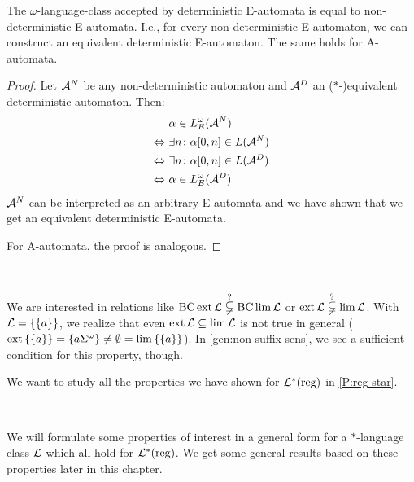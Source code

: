 \begin{lemma}
\label{gen:e-determinism}
The $\omega$-language-class accepted by deterministic E-automata is equal to non-deterministic E-automata. I.e., for every non-deterministic E-automaton, we can construct an equivalent deterministic E-automaton. The same holds for A-automata.
\begin{proof} Let $\mathcal{A}^N$ be any non-deterministic automaton and $\mathcal{A}^D$ an ($*$-)equivalent deterministic automaton. Then:
\begin{align*}
& \alpha \in L^{\omega}_E(\mathcal{A}^N) \\
\Leftrightarrow \ & \exists n \colon \alpha[0,n] \in L(\mathcal{A}^N) \\
\Leftrightarrow \ & \exists n \colon \alpha[0,n] \in L(\mathcal{A}^D) \\
\Leftrightarrow \ & \alpha \in L^{\omega}_E(\mathcal{A}^D)
\end{align*}
$\mathcal{A}^N$ can be interpreted as an arbitrary E-automata and we have shown that we get an equivalent deterministic E-automata.

For A-automata, the proof is analogous.
\end{proof}
\end{lemma}

\

We are interested in relations like $\operatorname{BC} \operatorname{ext} \mathcal{L} \overset{?}{\subsetneqq} \operatorname{BC} \lim \mathcal{L}$ or $\operatorname{ext} \mathcal{L} \overset{?}{\subsetneqq} \lim \mathcal{L}$. With $\Lang = \Set{\Set{a}}$, we realize that even $\operatorname{ext} \mathcal{L} \subseteq \lim \mathcal{L}$ is not true in general ($\ext \Set{\Set{a}} = \Set{a \Sigma^\omega} \neq \emptyset = \lim \Set{\Set{a}}$). In \cref{gen:non-suffix-sens}, we see a sufficient condition for this property, though.

We want to study all the properties we have shown for $\mathcal{L}^*(\textup{\textrm{reg}})$ in \cref{P:reg-star}.

\

We will formulate some properties of interest in a general form for a $*$-language class $\mathcal{L}$ which all hold for $\mathcal{L}^*(\textup{\textrm{reg}})$. We get some general results based on these properties later in this chapter. %

